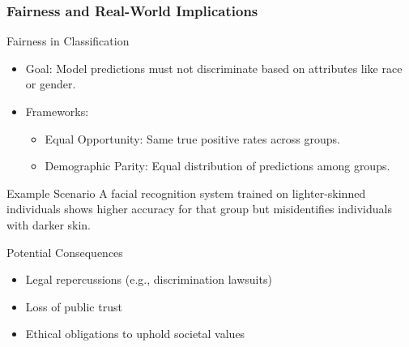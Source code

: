 \documentclass[aspectratio=169]{beamer}
\begin{document}
\begin{frame}[fragile]
    \frametitle{Fairness and Real-World Implications}
    \begin{block}{Fairness in Classification}
        \begin{itemize}
            \item Goal: Model predictions must not discriminate based on attributes like race or gender.
            \item Frameworks: 
            \begin{itemize}
                \item Equal Opportunity: Same true positive rates across groups.
                \item Demographic Parity: Equal distribution of predictions among groups.
            \end{itemize}
        \end{itemize}
    \end{block}
    
    \begin{block}{Example Scenario}
        A facial recognition system trained on lighter-skinned individuals shows higher accuracy for that group but misidentifies individuals with darker skin.
    \end{block}

    \begin{block}{Potential Consequences}
        \begin{itemize}
            \item Legal repercussions (e.g., discrimination lawsuits)
            \item Loss of public trust
            \item Ethical obligations to uphold societal values
        \end{itemize}
    \end{block}
\end{frame}
\end{document}
